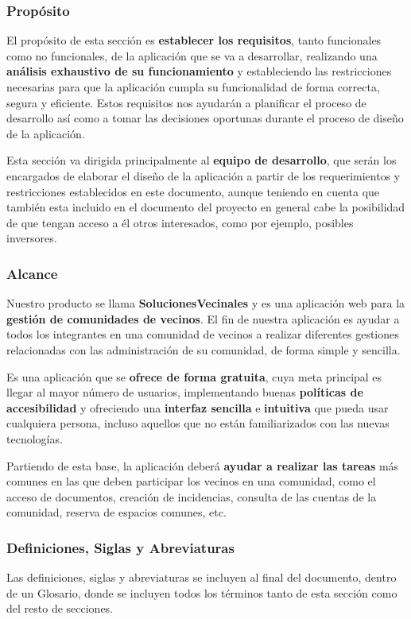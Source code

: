 \subsubsection{Propósito}
El propósito de esta sección es \textbf{establecer los requisitos}, tanto funcionales como no funcionales, de la aplicación que se va a desarrollar, realizando una \textbf{análisis exhaustivo de su funcionamiento} y estableciendo las restricciones necesarias para que la aplicación cumpla su funcionalidad de forma correcta, segura y eficiente. Estos requisitos nos ayudarán a planificar el proceso de desarrollo así como a tomar las decisiones oportunas durante el proceso de diseño de la aplicación.

Esta sección va dirigida principalmente al \textbf{equipo de desarrollo}, que serán los encargados de elaborar el diseño de la aplicación a partir de los requerimientos y restricciones establecidos en este documento, aunque teniendo en cuenta que también esta incluido en el documento del proyecto en general cabe la posibilidad de que tengan acceso a él otros interesados, como por ejemplo, posibles inversores.

\subsubsection{Alcance}
Nuestro producto se llama \textbf{SolucionesVecinales} y es una aplicación web para la \textbf{gestión de comunidades de vecinos}. El fin de nuestra aplicación es ayudar a todos los integrantes en una comunidad de vecinos a realizar diferentes gestiones relacionadas con las administración de su comunidad, de forma simple y sencilla. 

Es una aplicación que se \textbf{ofrece de forma gratuita}, cuya meta principal es llegar al mayor número de usuarios, implementando buenas \textbf{políticas de accesibilidad} y ofreciendo una \textbf{interfaz sencilla} e \textbf{intuitiva} que pueda usar cualquiera persona, incluso aquellos que no están familiarizados con las nuevas tecnologías. 

Partiendo de esta base, la aplicación deberá \textbf{ayudar a realizar las tareas} más comunes en las que deben participar los vecinos en una comunidad, como el acceso de documentos, creación de incidencias, consulta de las cuentas de la comunidad,  reserva de espacios comunes, etc.

\subsubsection{Definiciones, Siglas y Abreviaturas}
Las definiciones, siglas y abreviaturas se incluyen al final del documento, dentro de un Glosario, donde se incluyen todos los términos tanto de esta sección como del resto de secciones.

